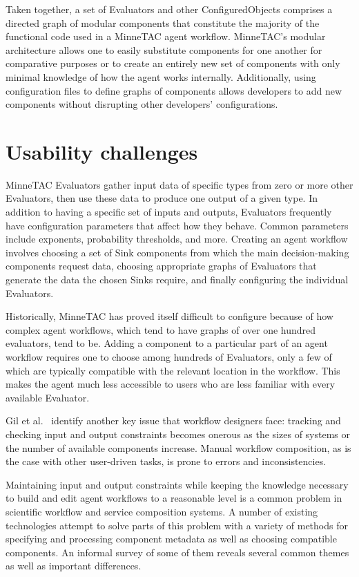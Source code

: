 \documentclass{article}
\begin{document}
Taken together, a set of Evaluators and other ConfiguredObjects comprises a directed graph of modular components that constitute the majority of the functional code used in a MinneTAC agent workflow.
MinneTAC's modular architecture allows one to easily substitute components for one another for comparative purposes or to create an entirely new set of components with only minimal knowledge of how the agent works internally.
Additionally, using configuration files to define graphs of components allows developers to add new components without disrupting other developers' configurations.

\section{Usability challenges}
\label{sec:challenges}

MinneTAC Evaluators gather input data of specific types from zero or more other Evaluators, then use these data to produce one output of a given type.
In addition to having a specific set of inputs and outputs, Evaluators frequently have configuration parameters that affect how they behave.
Common parameters include exponents, probability thresholds, and more.
Creating an agent workflow involves choosing a set of Sink components from which the main decision-making components request data, choosing appropriate graphs of Evaluators that generate the data the chosen Sinks require, and finally configuring the individual Evaluators.~\cite{Collins08TR}

Historically, MinneTAC has proved itself difficult to configure because of how complex agent workflows, which tend to have graphs of over one hundred evaluators, tend to be.
Adding a component to a particular part of an agent workflow requires one to choose among hundreds of Evaluators, only a few of which are typically compatible with the relevant location in the workflow.
This makes the agent much less accessible to users who are less familiar with every available Evaluator.

Gil et al.~\cite{gil2010wings} identify another key issue that workflow designers face:  tracking and checking input and output constraints becomes onerous as the sizes of systems or the number of available components increase.
Manual workflow composition, as is the case with other user-driven tasks, is prone to errors and inconsistencies.

Maintaining input and output constraints while keeping the knowledge necessary to build and edit agent workflows to a reasonable level is a common problem in scientific workflow and service composition systems.
A number of existing technologies attempt to solve parts of this problem with a variety of methods for specifying and processing component metadata as well as choosing compatible components.
An informal survey of some of them reveals several common themes as well as important differences.
\end{document}
